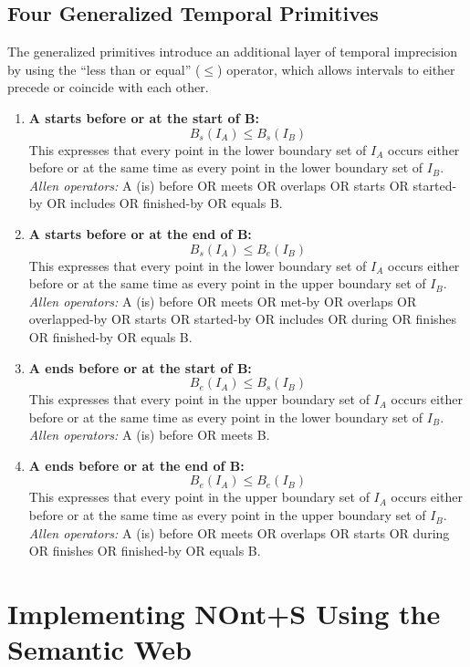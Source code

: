 \subsection{Four Generalized Temporal Primitives}\label{V-subsec:fourTemporalPrimitives}

The generalized primitives introduce an additional layer of temporal imprecision by using the “less than or equal” (\( \leq \)) operator, which allows intervals to either precede or coincide with each other.

\begin{enumerate}
    \item \textbf{A starts before or at the start of B:}  
    \[
    B_s(I_A) \leq B_s(I_B)
    \]
    This expresses that every point in the lower boundary set of \( I_A \) occurs either before or at the same time as every point in the lower boundary set of \( I_B \).  
    \textit{Allen operators:} A (is) before OR meets OR overlaps OR starts OR started-by OR includes OR finished-by OR equals B.

    \item \textbf{A starts before or at the end of B:}  
    \[
    B_s(I_A) \leq B_e(I_B)
    \]
    This expresses that every point in the lower boundary set of \( I_A \) occurs either before or at the same time as every point in the upper boundary set of \( I_B \).  
    \textit{Allen operators:} A (is) before OR meets OR met-by OR overlaps OR overlapped-by OR starts OR started-by OR includes OR during OR finishes OR finished-by OR equals B.

    \item \textbf{A ends before or at the start of B:}  
    \[
    B_e(I_A) \leq B_s(I_B)
    \]
    This expresses that every point in the upper boundary set of \( I_A \) occurs either before or at the same time as every point in the lower boundary set of \( I_B \).  
    \textit{Allen operators:} A (is) before OR meets B.

    \item \textbf{A ends before or at the end of B:}  
    \[
    B_e(I_A) \leq B_e(I_B)
    \]
    This expresses that every point in the upper boundary set of \( I_A \) occurs either before or at the same time as every point in the upper boundary set of \( I_B \).  
    \textit{Allen operators:} A (is) before OR meets OR overlaps OR starts OR during OR finishes OR finished-by OR equals B.
\end{enumerate}


\section{Implementing NOnt+S Using the Semantic Web}\label{V-sec:nont+s-SW}

